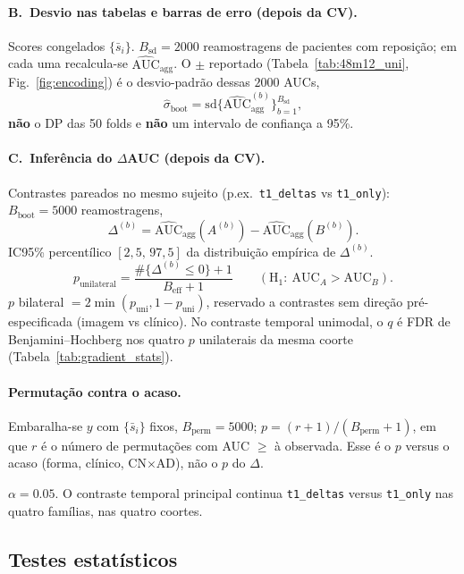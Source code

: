 \documentclass[review]{elsarticle}
\newcommand{\code}[1]{\texttt{#1}}
\begin{document}
\paragraph{B.~Desvio nas tabelas e barras de erro (depois da CV).}
Scores congelados $\{\bar{s}_i\}$.
$B_{\mathrm{sd}}=2000$ reamostragens de pacientes com reposição; em cada uma recalcula-se $\widehat{\mathrm{AUC}}_{\mathrm{agg}}$.
O $\pm$ reportado (Tabela~\ref{tab:48m12_uni}, Fig.~\ref{fig:encoding}) é o desvio-padrão dessas $2000$ AUCs,
\[
	\widehat{\sigma}_{\mathrm{boot}}
	= \mathrm{sd}\bigl\{\widehat{\mathrm{AUC}}_{\mathrm{agg}}^{(b)}\bigr\}_{b=1}^{B_{\mathrm{sd}}},
\]
\textbf{não} o DP das 50 folds e \textbf{não} um intervalo de confiança a 95\%.

\paragraph{C.~Inferência do $\Delta$AUC (depois da CV).}
Contrastes pareados no mesmo sujeito (p.ex.\ \code{t1\_deltas} vs \code{t1\_only}): $B_{\mathrm{boot}}=5000$ reamostragens,
\[
	\Delta^{(b)}
	= \widehat{\mathrm{AUC}}_{\mathrm{agg}}(A^{(b)})
	- \widehat{\mathrm{AUC}}_{\mathrm{agg}}(B^{(b)}).
\]
IC95\% percentílico $[2{,}5,\,97{,}5]$ da distribuição empírica de $\Delta^{(b)}$.
\[
	p_{\mathrm{unilateral}}
	= \frac{\#\{\Delta^{(b)}\le 0\}+1}{B_{\mathrm{eff}}+1}
	\qquad
	(\mathrm{H}_1{:}\ \mathrm{AUC}_A>\mathrm{AUC}_B).
\]
$p$ bilateral $=2\min(p_{\mathrm{uni}},1-p_{\mathrm{uni}})$, reservado a contrastes sem direção pré-especificada (imagem vs clínico).
No contraste temporal unimodal, o $q$ é FDR de Benjamini--Hochberg nos quatro $p$ unilaterais da mesma coorte (Tabela~\ref{tab:gradient_stats}).

\paragraph{Permutação contra o acaso.}
Embaralha-se $y$ com $\{\bar{s}_i\}$ fixos, $B_{\mathrm{perm}}=5000$;
$p=(r+1)/(B_{\mathrm{perm}}+1)$, em que $r$ é o número de permutações com AUC $\ge$ à observada.
Esse é o $p$ versus o acaso (forma, clínico, CN$\times$AD), não o $p$ do $\Delta$.

$\alpha=0.05$.
O contraste temporal principal continua \code{t1\_deltas} versus \code{t1\_only} nas quatro famílias, nas quatro coortes.
	
	\subsection{Testes estatísticos}
	\label{sec:stats}
	
\end{document}
